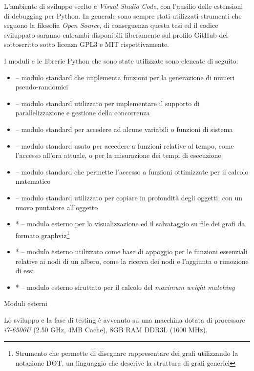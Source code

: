L'ambiente di sviluppo scelto è \textit{Visual Studio Code}, con l'ausilio delle estensioni di debugging per Python. In generale sono sempre stati utilizzati strumenti che seguono la filosofia \textit{Open Source}, di conseguenza questa tesi ed il codice sviluppato saranno entrambi disponibili liberamente sul profilo GitHub \cite{mygithub} del sottoscritto sotto licenza GPL3 e MIT rispettivamente.

I moduli e le librerie Python che sono state utilizzate sono elencate di seguito: \begin{itemize}
  \item {} -- modulo standard che implementa funzioni per la generazione di numeri pseudo-randomici
  \item {} -- modulo standard utilizzato per implementare il supporto di parallelizzazione e gestione della concorrenza
  \item {} -- modulo standard per accedere ad alcune variabili o funzioni di sistema
  \item {} -- modulo standard usato per accedere a funzioni relative al tempo, come l'accesso all'ora attuale, o per la misurazione dei tempi di esecuzione
  \item {} -- modulo standard che permette l'accesso a funzioni ottimizzate per il calcolo matematico
  \item {} -- modulo standard utilizzato per copiare in profondità degli oggetti, con un nuovo puntatore all'oggetto
  \item *  -- modulo esterno per la visualizzazione ed il salvataggio su file dei grafi da formato graphviz\footnote{Strumento che permette di disegnare rappresentare dei grafi utilizzando la notazione DOT, un linguaggio che descrive la struttura di grafi generici}
  \item *  -- modulo esterno utilizzato come base di appoggio per le funzioni essenziali relative ai nodi di un albero, come la ricerca dei nodi e l'aggiunta o rimozione di essi
  \item *  -- modulo esterno sfruttato per il calcolo del \textit{maximum weight matching}
\end{itemize}

\small * Moduli esterni

Lo sviluppo e la fase di testing è avvenuto su una macchina dotata di processore \textit{i7-6500U} (2.50 GHz, 4MB Cache), 8GB RAM DDR3L (1600 MHz).

